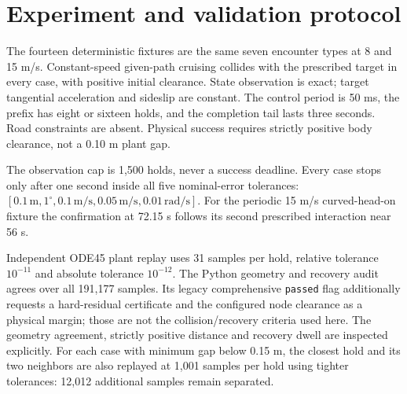 \documentclass[11pt]{article}
\begin{document}
\section{Experiment and validation protocol}
The fourteen deterministic fixtures are the same seven encounter types at
8 and 15 m/s. Constant-speed given-path cruising collides with the prescribed
target in every case, with positive initial clearance. State observation is
exact; target tangential acceleration and sideslip are constant. The control
period is 50 ms, the prefix has eight or sixteen holds, and the completion
tail lasts three seconds. Road constraints are absent. Physical success
requires strictly positive body clearance, not a 0.10 m plant gap.

The observation cap is 1,500 holds, never a success deadline. Every case stops
only after one second inside all five nominal-error tolerances:
$[0.1\,\mathrm m,1^\circ,0.1\,\mathrm{m/s},0.05\,\mathrm{m/s},
0.01\,\mathrm{rad/s}]$. For the periodic 15 m/s curved-head-on fixture the
confirmation at 72.15 s follows its second prescribed interaction near 56 s.

Independent ODE45 plant replay uses 31 samples per hold, relative tolerance
$10^{-11}$ and absolute tolerance $10^{-12}$. The Python geometry and
recovery audit agrees over all 191,177 samples. Its legacy comprehensive
\texttt{passed} flag additionally requests a hard-residual certificate and
the configured node clearance as a physical margin; those are not the
collision/recovery criteria used here. The geometry agreement, strictly
positive distance and recovery dwell are inspected explicitly. For each
case with minimum gap below 0.15 m, the closest hold and its two neighbors
are also replayed at 1,001 samples per hold using tighter tolerances:
12,012 additional samples remain separated.
\end{document}
